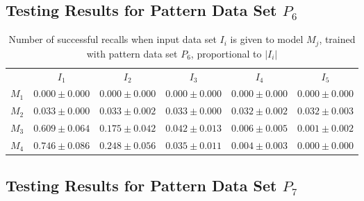 \documentclass[anon]{CI}
\begin{document}
		\subsection{Testing Results for Pattern Data Set $P_{6}$}
		
		
		\begin{table}[H]
			\centering
			\def\arraystretch{1.5}
			\footnotesize
			\begin{tabular}{cccccc}
				
				& $I_{1}$  & $I_{2}$  & $I_{3}$  & $I_{4}$  & $I_{5}$ \\ \cline{2-6}
				$M_{1}$  & $0.000\pm0.000$  & $0.000\pm0.000$  & $0.000\pm0.000$  & $0.000\pm0.000$  & $0.000\pm0.000$ \\
				$M_{2}$  & $0.033\pm0.000$  & $0.033\pm0.002$  & $0.033\pm0.000$  & $0.032\pm0.002$  & $0.032\pm0.003$ \\
				$M_{3}$  & $0.609\pm0.064$  & $0.175\pm0.042$  & $0.042\pm0.013$  & $0.006\pm0.005$  & $0.001\pm0.002$ \\
				$M_{4}$  & $0.746\pm0.086$  & $0.248\pm0.056$  & $0.035\pm0.011$  & $0.004\pm0.003$  & $0.000\pm0.000$ \\
				
			\end{tabular}
			\caption{Number of successful recalls when input data set $I_i$ is given to model $M_j$, trained with pattern data set $P_{6}$, proportional to $\left|I_i\right|$}
		\end{table}
		
		\subsection{Testing Results for Pattern Data Set $P_{7}$}
		
		
\end{document}
